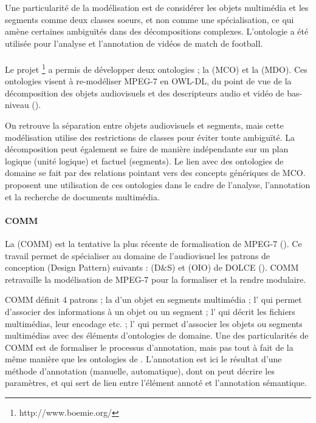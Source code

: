 Une particularité de la modélisation est de considérer les objets multimédia et les segments comme deux classes soeurs, et non comme une spécialisation, ce qui amène certaines ambiguïtés dans des décompositions complexes.
L'ontologie a été utilisée pour l'analyse et l'annotation de vidéos de match de football.


\paragraph{}
Le projet \footnote{http://www.boemie.org/} a permis de développer deux ontologies ; la  (MCO) et la  (MDO). 
Ces ontologies visent à re-modéliser MPEG-7 en OWL-DL, du point de vue de la décomposition des objets audiovisuels et des descripteurs audio et vidéo de bas-niveau (\cite{Dasiopoulou2009a}).

On retrouve la séparation entre objets audiovisuels et segments, mais cette modélisation utilise des restrictions de classes pour éviter toute ambiguïté.
La décomposition peut également se faire de manière indépendante sur un plan logique (unité logique) et factuel (segments).
Le lien avec des ontologies de domaine se fait par des relations pointant vers des concepts génériques de MCO.
\cite{Karkaletsis2005} proposent une utilisation de ces ontologies dans le cadre de l'analyse, l'annotation et la recherche de documents multimédia.


\paragraph{COMM}
La  (COMM) est la tentative la plus récente de formalisation de MPEG-7 (\cite{Arndt2007, Staab2008, Arndt2009}).
Ce travail permet de spécialiser au domaine de l'audiovisuel les patrons de conception (Design Pattern) suivants :  (D\&S) et  (OIO) de DOLCE (\cite{Gangemi2005}).
COMM retravaille la modélisation de MPEG-7 pour la formaliser et la rendre modulaire. 

COMM définit 4 patrons ; la  d'un objet en segments multimédia ; l' qui permet d'associer des informations à un objet ou un segment ; l' qui décrit les fichiers multimédias, leur encodage etc. ; l' qui permet d'associer les objets ou segments multimédias avec des éléments d'ontologies de domaine. 
Une des particularités de COMM est de formaliser le processus d'annotation, mais pas tout à fait de la même manière que les ontologies de .
L'annotation est ici le résultat d'une méthode d'annotation (manuelle, automatique), dont on peut décrire les paramètres, et qui sert de lien entre l'élément annoté et l'annotation sémantique.


